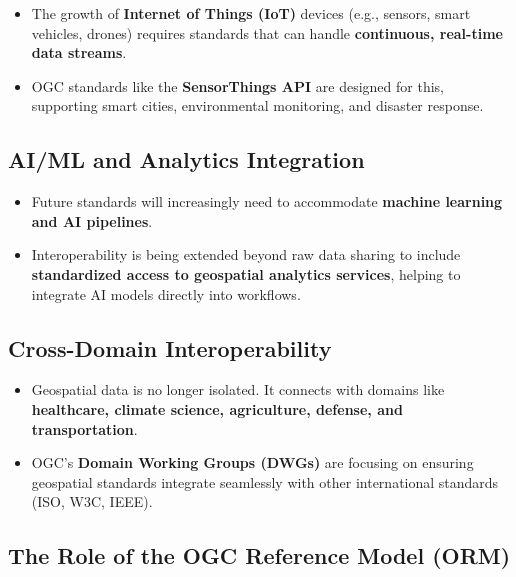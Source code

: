 \documentclass[
  11pt,
  letterpaper,
]{book}
\providecommand{\tightlist}{%
  \setlength{\itemsep}{0pt}\setlength{\parskip}{0pt}}
\begin{document}
\begin{itemize}
\tightlist
\item
  The growth of \textbf{Internet of Things (IoT)} devices (e.g.,
  sensors, smart vehicles, drones) requires standards that can handle
  \textbf{continuous, real-time data streams}.\\
\item
  OGC standards like the \textbf{SensorThings API} are designed for
  this, supporting smart cities, environmental monitoring, and disaster
  response.
\end{itemize}

\subsection{AI/ML and Analytics
Integration}\label{aiml-and-analytics-integration}

\begin{itemize}
\tightlist
\item
  Future standards will increasingly need to accommodate \textbf{machine
  learning and AI pipelines}.\\
\item
  Interoperability is being extended beyond raw data sharing to include
  \textbf{standardized access to geospatial analytics services}, helping
  to integrate AI models directly into workflows.
\end{itemize}

\subsection{Cross-Domain
Interoperability}\label{cross-domain-interoperability}

\begin{itemize}
\tightlist
\item
  Geospatial data is no longer isolated. It connects with domains like
  \textbf{healthcare, climate science, agriculture, defense, and
  transportation}.\\
\item
  OGC's \textbf{Domain Working Groups (DWGs)} are focusing on ensuring
  geospatial standards integrate seamlessly with other international
  standards (ISO, W3C, IEEE).
\end{itemize}

\subsection{The Role of the OGC Reference Model
(ORM)}\label{the-role-of-the-ogc-reference-model-orm}
\end{document}
